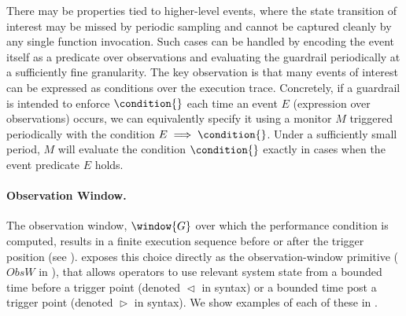 There may be properties tied to higher-level events, where the state transition of interest may be missed by periodic sampling and cannot be captured cleanly by any single function invocation.
Such cases can be handled by encoding the event itself as a predicate over observations and evaluating the guardrail periodically at a sufficiently fine granularity.
The key observation is that many events of interest can be expressed as conditions over the execution trace.
Concretely, if a guardrail is intended to enforce $\condition{}$ each time an event $E$ (expression over observations) occurs, we can equivalently specify it using a monitor $M$ triggered periodically with the condition $E\implies\condition{}$. Under a sufficiently small period, $M$ will evaluate the condition $\condition{}$ exactly in cases when the event predicate $E$ holds.

\paragraph{Observation Window.}
 
The observation window, $\window{G}$ over which the performance condition is computed, results in a finite execution sequence before or after the trigger position (see ).
\lang exposes this choice directly as the observation-window primitive ($ObsW$ in ), that allows operators to use relevant system state from a bounded time before a trigger point (denoted $\vartriangleleft$ in \lang syntax) or a bounded time post a trigger point (denoted $\vartriangleright$ in \lang syntax).
We show examples of each of these in .
 

